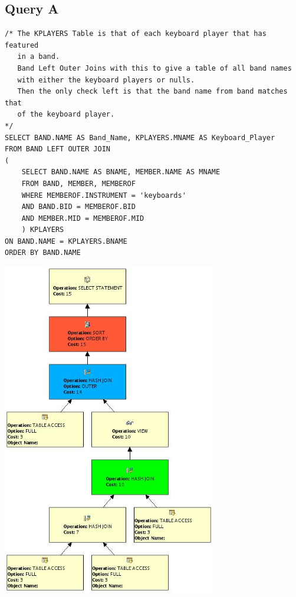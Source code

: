 \documentclass{report}
\begin{document}
\subsection*{Query A}
\begin{verbatim}
/* The KPLAYERS Table is that of each keyboard player that has featured
   in a band.
   Band Left Outer Joins with this to give a table of all band names
   with either the keyboard players or nulls.
   Then the only check left is that the band name from band matches that
   of the keyboard player.
*/
SELECT BAND.NAME AS Band_Name, KPLAYERS.MNAME AS Keyboard_Player
FROM BAND LEFT OUTER JOIN 
(
    SELECT BAND.NAME AS BNAME, MEMBER.NAME AS MNAME 
    FROM BAND, MEMBER, MEMBEROF 
    WHERE MEMBEROF.INSTRUMENT = 'keyboards' 
    AND BAND.BID = MEMBEROF.BID 
    AND MEMBER.MID = MEMBEROF.MID 
    ) KPLAYERS
ON BAND.NAME = KPLAYERS.BNAME 
ORDER BY BAND.NAME
\end{verbatim}
\includegraphics[width=0.7\textwidth]{Q4A}
\end{document}
